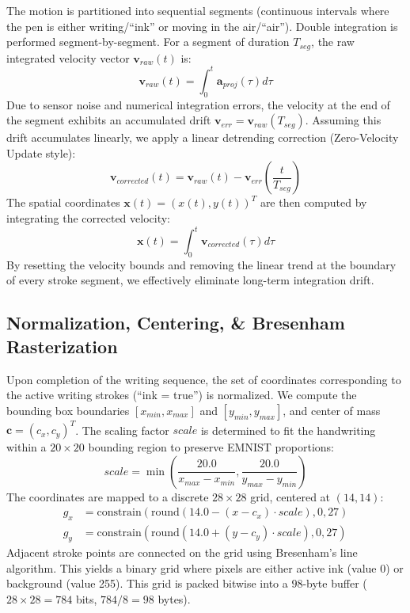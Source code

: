 \documentclass[12pt,a4paper]{article}
\begin{document}
The motion is partitioned into sequential segments (continuous intervals where the pen is either writing/``ink'' or moving in the air/``air''). Double integration is performed segment-by-segment. For a segment of duration $T_{seg}$, the raw integrated velocity vector $\mathbf{v}_{raw}(t)$ is:
\begin{equation}
    \mathbf{v}_{raw}(t) = \int_{0}^{t} \mathbf{a}_{proj}(\tau) d\tau
\end{equation}
Due to sensor noise and numerical integration errors, the velocity at the end of the segment exhibits an accumulated drift $\mathbf{v}_{err} = \mathbf{v}_{raw}(T_{seg})$. Assuming this drift accumulates linearly, we apply a linear detrending correction (Zero-Velocity Update style):
\begin{equation}
    \mathbf{v}_{corrected}(t) = \mathbf{v}_{raw}(t) - \mathbf{v}_{err} \left( \frac{t}{T_{seg}} \right)
\end{equation}
The spatial coordinates $\mathbf{x}(t) = (x(t), y(t))^T$ are then computed by integrating the corrected velocity:
\begin{equation}
    \mathbf{x}(t) = \int_{0}^{t} \mathbf{v}_{corrected}(\tau) d\tau
\end{equation}
By resetting the velocity bounds and removing the linear trend at the boundary of every stroke segment, we effectively eliminate long-term integration drift.

\subsection{Normalization, Centering, \& Bresenham Rasterization}
Upon completion of the writing sequence, the set of coordinates corresponding to the active writing strokes (``ink = true'') is normalized. We compute the bounding box boundaries $[x_{min}, x_{max}]$ and $[y_{min}, y_{max}]$, and center of mass $\mathbf{c} = (c_x, c_y)^T$. The scaling factor $scale$ is determined to fit the handwriting within a $20 \times 20$ bounding region to preserve EMNIST proportions:
\begin{equation}
    scale = \min \left( \frac{20.0}{x_{max} - x_{min}}, \frac{20.0}{y_{max} - y_{min}} \right)
\end{equation}
The coordinates are mapped to a discrete $28 \times 28$ grid, centered at $(14, 14)$:
\begin{align}
    g_x &= \text{constrain}\left( \text{round}\left( 14.0 - (x - c_x) \cdot scale \right), 0, 27 \right) \\
    g_y &= \text{constrain}\left( \text{round}\left( 14.0 + (y - c_y) \cdot scale \right), 0, 27 \right)
\end{align}
Adjacent stroke points are connected on the grid using Bresenham's line algorithm. This yields a binary grid where pixels are either active ink (value 0) or background (value 255). This grid is packed bitwise into a $98$-byte buffer ($28 \times 28 = 784$ bits, $784 / 8 = 98$ bytes).
\end{document}

